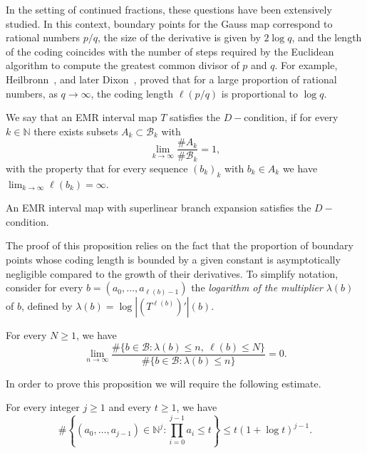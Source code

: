 \documentclass[letterpaper,11pt]{amsart}
\numberwithin{equation}{section}     %
\newcommand{\N}{\mathbb{N}}
\def\N{{\mathbb N}}
\def\B{{\mathcal B}}
\def\le{\leqslant}
\def\ge{\geqslant}
\begin{document}
In the setting of continued fractions, these questions have been extensively studied. In this context, boundary points for the Gauss map correspond to rational numbers $p/q$, the size of the derivative is given by $2\log q$, and the length of the coding coincides with the number of steps required by the Euclidean algorithm to compute the greatest common divisor of $p$ and $q$. For example, Heilbronn~\cite{he}, and later Dixon~\cite{di}, proved that for a large proportion of rational numbers, as $q \to \infty$, the coding length $\ell(p/q)$ is proportional to $\log q$. 


\begin{definition} We say that an EMR interval map $T$ satisfies the $D-$condition, if for every $k \in \N$ there exists subsets $A_k \subset \B_k$  with
\begin{equation*}
\lim_{k \to \infty} \frac{\# A_k}{\# \B_k}=1,
\end{equation*}
with the property that for every sequence $(b_k)_k$ with  $b_k \in A_k$ we have $\lim_{k \to \infty} \ell(b_k)=\infty$.
\end{definition}

\begin{proposition}\label{thm:weakdixonIM} An EMR interval map with superlinear branch expansion satisfies the $D-$condition.
\end{proposition}

The proof of this proposition relies on the fact that the proportion of boundary points whose coding length is bounded by a given constant is asymptotically negligible compared to the growth of their derivatives. To simplify notation, consider for every $b=(a_0, \dots , a_{\ell(b)-1})$ the \emph{logarithm of the multiplier} $\lambda(b)$ of $b$, defined by $\lambda(b)= \log |(T^{\ell(b)})'|(b)$.


\begin{proposition}\label{prop:largelengt}
For every $N\ge 1$, we have
\[
\lim_{n\to\infty}
\frac{
\#\{b\in \mathcal{B}:\lambda(b)\le n,\ \ell(b)\le N\}
}{
\#\{b\in \mathcal{B}:\lambda(b)\le n\}
}=0 .
\]
\end{proposition}
In order to prove this proposition we will require the following estimate.

\begin{lemma}\label{lem:divisor-estimate}
For every integer $j\ge 1$ and every $t\ge 1$, we have
\[
\#\left\{(a_0,\ldots,a_{j-1})\in\mathbb N^j:
\prod_{i=0}^{j-1}a_i\le t\right\}
\le t(1+\log t)^{j-1} .
\]
\end{lemma}
\end{document}
